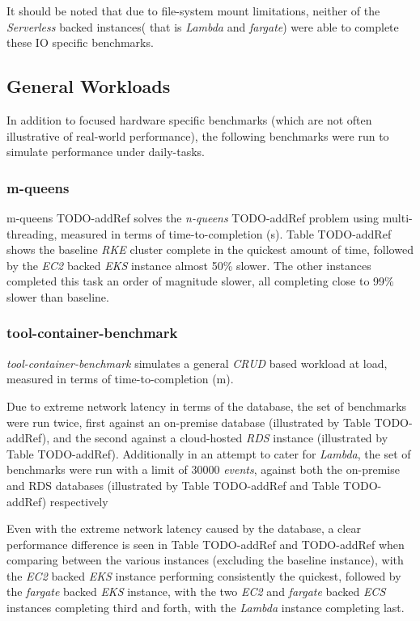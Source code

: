 \noindent \newline It should be noted that due to file-system mount limitations, neither of the \textit{Serverless} backed instances( that is \textit{Lambda} and \textit{fargate}) were able to complete these I\/O specific benchmarks.

\subsection{General Workloads}
In addition to focused hardware specific benchmarks (which are not often illustrative of real-world performance),
the following benchmarks were run to simulate performance under daily-tasks.

\subsubsection{m-queens}
m-queens TODO-addRef solves the \emph{n-queens} TODO-addRef problem using multi-threading, measured in terms of time-to-completion (s).
Table TODO-addRef shows the baseline \textit{RKE} cluster complete in the quickest amount of time,
followed by the \textit{EC2} backed \textit{EKS} instance almost 50\% slower.
The other instances completed this task an order of magnitude slower, all completing close to 99\% slower than baseline.

\subsubsection{tool-container-benchmark}
\emph{tool-container-benchmark} simulates a general \textit{CRUD} based workload at load, measured in terms of time-to-completion (m).

Due to extreme network latency in terms of the database, the set of benchmarks were run twice, first against an on-premise database (illustrated by Table TODO-addRef),
and the second against a cloud-hosted \textit{RDS} instance (illustrated by Table TODO-addRef).
Additionally in an attempt to cater for \textit{Lambda}, the set of benchmarks were run with a limit of 30000 \emph{events}, against both the on-premise and RDS databases
(illustrated by Table TODO-addRef and Table TODO-addRef) respectively

Even with the extreme network latency caused by the database, a clear performance difference is seen in Table TODO-addRef and TODO-addRef when comparing between the various instances (excluding the baseline instance),
with the \textit{EC2} backed \textit{EKS} instance performing consistently the quickest, followed by the \textit{fargate} backed \textit{EKS} instance,
with the two \textit{EC2} and \textit{fargate} backed \textit{ECS} instances completing third and forth, with the \textit{Lambda} instance completing last.

